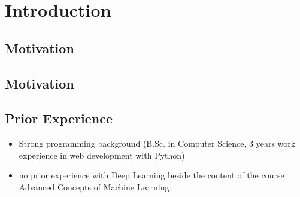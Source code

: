 \section{Introduction}

\subsection{Motivation}

\subsection{Motivation}

\subsection{Prior Experience}

\begin{itemize}
	\item Strong programming background (B.Sc. in Computer Science, 3 years work experience in web development with Python)
	\item no prior experience with Deep Learning beside the content of the course Advanced Concepts of Machine Learning
\end{itemize}